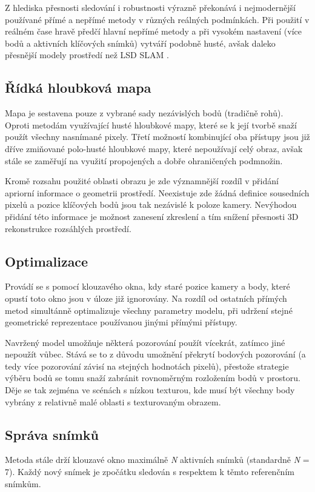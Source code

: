 \documentclass[12pt,a4paper]{report}
\begin{document}
Z hlediska přesnosti sledování i robustnosti výrazně překonává i nejmodernější použí\-vané přímé a nepřímé metody v různých reálných podmínkách. Při použití v reálném čase hravě předčí hlavní nepřímé metody a při vysokém nastavení (více bodů a aktivních klíčových snímků) vytváří podobně husté, avšak daleko přesnější modely prostředí než LSD SLAM \cite{Engel2018_DSO}.

\subsection*{Řídká hloubková mapa} Mapa je sestavena pouze z vybrané sady nezávislých bodů (tradičně rohů). Oproti metodám využívající husté hloubkové mapy, které se k její tvorbě snaží použít všechny nasnímané pixely. Třetí možností kombinující oba přístupy jsou již dříve zmiňované polo-husté hloubkové mapy, které nepoužívají celý obraz, avšak stále se zaměřují na využití propojených a dobře ohraničených podmnožin. 

Kromě rozsahu použité oblasti obrazu je zde významnější rozdíl v přidání apriorní informace o geometrii prostředí. Neexistuje zde žádná definice sousedních pixelů a pozice klíčových bodů jsou tak nezávislé k poloze kamery. Nevýhodou přidání této informace je možnost zanesení zkreslení a tím snížení přesnosti 3D rekonstrukce rozsáhlých prostředí. 

\subsection*{Optimalizace} Provádí se s pomocí klouzavého okna, kdy staré pozice kamery a body, které opustí toto okno jsou v úloze již ignorovány. Na rozdíl od ostatních přímých metod simultánně optimalizuje všechny parametry modelu, při udržení stejné geometrické reprezentace používanou jinými přímými přístupy.

Navržený model umožňuje některá pozorování použít vícekrát, zatímco jiné nepoužít vůbec. Stává se to z důvodu umožnění překrytí bodových pozorování (a tedy více pozorování závisí na stejných hodnotách pixelů), přestože strategie výběru bodů se tomu snaží zabránit rovnoměrným rozložením bodů v prostoru. Děje se tak zejména ve scénách s nízkou texturou, kde musí být všechny body vybrány z relativně malé oblasti s texturovaným obrazem. 

\subsection*{Správa snímků}
Metoda stále drží klouzavé okno maximálně \textit{N} aktivních snímků (standardně \textit{N} = 7). Každý nový snímek je zpočátku sledován s respektem k těmto referenčním snímkům.
\end{document}
